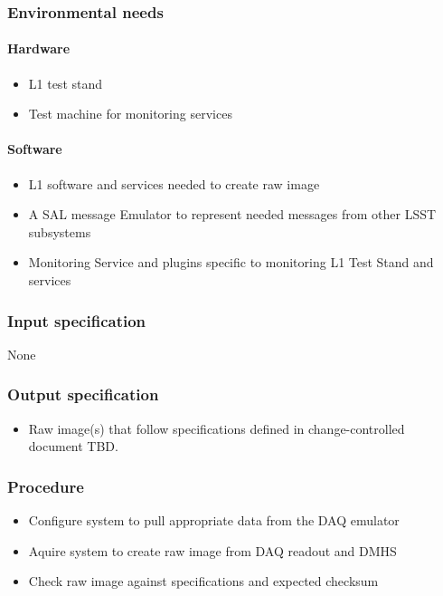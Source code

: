 \documentclass[DM,lsstdraft,STS,toc]{lsstdoc}
\begin{document}
\subsubsection{Environmental needs}
\paragraph{Hardware}
\begin{itemize}
\item{L1 test stand}
\item{Test machine for monitoring services}
\end{itemize}


\paragraph{Software}
\begin{itemize}
\item{L1 software and services needed to create raw image}
\item{A SAL message Emulator to represent needed messages from other LSST subsystems}
\item{Monitoring Service and plugins specific to monitoring L1 Test Stand and services}
\end{itemize}


\subsubsection{Input specification}
None
\subsubsection{Output specification}
\begin{itemize}
\item{Raw image(s) that follow specifications defined in change-controlled document TBD.}
\end{itemize}


\subsubsection{Procedure}
\begin{itemize}
\item{Configure system to pull appropriate data from the DAQ emulator}
\item{Aquire system to create raw image from DAQ readout and DMHS}
\item{Check raw image against specifications and expected checksum}
\end{itemize}
\end{document}
